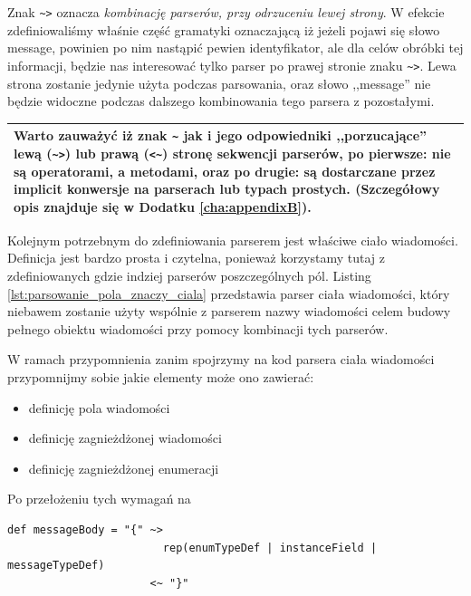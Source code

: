 \documentclass[pdflatex,11pt]{aghdpl}
\begin{document}
Znak \verb|~>| oznacza \textit{kombinację parserów, przy odrzuceniu lewej strony}. W efekcie zdefiniowaliśmy właśnie część gramatyki
oznaczającą iż jeżeli pojawi się słowo message, powinien po nim nastąpić pewien identyfikator, ale dla celów obróbki tej informacji, będzie nas interesować tylko
parser po prawej stronie znaku \verb|~>|. Lewa strona zostanie jedynie użyta podczas parsowania, oraz słowo ,,message'' nie będzie widoczne podczas dalszego
kombinowania tego parsera z pozostałymi.

\begin{center}
\begin{tabular}{|p{\textwidth}|}
\hline Warto zauważyć iż znak \verb|~| jak i jego odpowiedniki ,,porzucające'' lewą (\verb|~>|) lub prawą (\verb|<~|) stronę sekwencji 
parserów, po pierwsze: nie są operatorami, a metodami, oraz po drugie: są dostarczane przez implicit konwersje na parserach lub typach prostych. 
 (Szczegółowy opis znajduje się w Dodatku \ref{cha:appendixB}).\\
\hline
\end{tabular}
\end{center}

Kolejnym potrzebnym do zdefiniowania parserem jest właściwe ciało wiadomości. Definicja jest bardzo prosta i czytelna, ponieważ korzystamy tutaj z 
zdefiniowanych gdzie indziej parserów poszczególnych pól. Listing \ref{lst:parsowanie_pola_znaczy_ciala} przedstawia parser ciała wiadomości,
który niebawem zostanie użyty wspólnie z parserem nazwy wiadomości celem budowy pełnego obiektu wiadomości przy pomocy kombinacji tych parserów.

W ramach przypomnienia zanim spojrzymy na kod parsera ciała wiadomości przypomnijmy sobie jakie elementy może ono zawierać:
\begin{itemize}
 \item definicję pola wiadomości
 \item definicję zagnieżdżonej wiadomości
 \item definicję zagnieżdżonej enumeracji
\end{itemize}

Po przełożeniu tych wymagań na


\begin{lstlisting}[caption={Parser ciała wiadomości}, label={lst:parsowanie_pola_znaczy_ciala}]
def messageBody = "{" ~> 
                        rep(enumTypeDef | instanceField | messageTypeDef) 
                      <~ "}"
\end{lstlisting}
\end{document}
